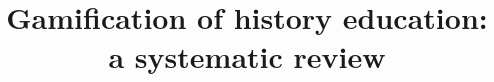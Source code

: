 \documentclass[a4paper,fleqn]{cas-sc}
\begin{document}
\let\WriteBookmarks\relax
\def\floatpagepagefraction{1}
\def\textpagefraction{.001}


\title[mode=title]{Gamification of history education: a systematic review}

%
%
%
%
%
%
%
%
%
%
%
%
%
\end{document}
